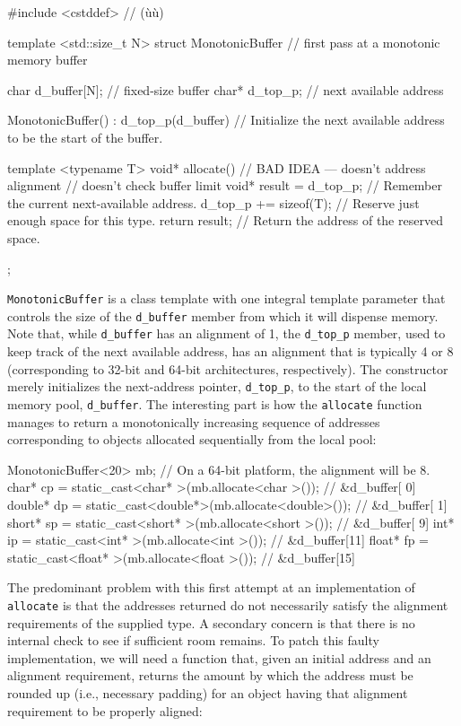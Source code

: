 \begin{emcppslisting}
#include <cstddef> // (ù{}ù) 

template <std::size_t N>
struct MonotonicBuffer  // first pass at a monotonic memory buffer
{
    char  d_buffer[N];  // fixed-size buffer
    char* d_top_p;      //  next available address

    MonotonicBuffer() : d_top_p(d_buffer) { }
       // Initialize the next available address to be the start of the buffer.

    template <typename T>
    void* allocate()             // BAD IDEA --- doesn't address alignment
                                 // doesn't check buffer limit
    {
        void* result = d_top_p;  // Remember the current next-available address.
        d_top_p += sizeof(T);    // Reserve just enough space for this type.
        return result;           // Return the address of the reserved space.
    }
};
\end{emcppslisting}
    
\noindent \lstinline!MonotonicBuffer! is a class template with one integral template
parameter that controls the size of the \lstinline!d_buffer! member from
which it will dispense memory. Note that, while \lstinline!d_buffer! has
an alignment of 1, the \lstinline!d_top_p! member, used to keep track of
the next available address, has an alignment that is typically 4 or 8
(corresponding to 32-bit and 64-bit architectures, respectively). The
constructor merely initializes the next-address pointer,
\lstinline!d_top_p!, to the start of the local memory pool,
\lstinline!d_buffer!. The interesting part is how the \lstinline!allocate!
function manages to return a monotonically increasing sequence of addresses corresponding to
objects allocated sequentially from the local pool:

\begin{emcppslisting}
MonotonicBuffer<20> mb;  // On a 64-bit platform, the alignment will be 8.
char*   cp = static_cast<char*  >(mb.allocate<char  >());  // &d_buffer[ 0]
double* dp = static_cast<double*>(mb.allocate<double>());  // &d_buffer[ 1]
short*  sp = static_cast<short* >(mb.allocate<short >());  // &d_buffer[ 9]
int*    ip = static_cast<int*   >(mb.allocate<int   >());  // &d_buffer[11]
float*  fp = static_cast<float* >(mb.allocate<float >());  // &d_buffer[15]
\end{emcppslisting}
    
\noindent The predominant problem with this first attempt at an implementation of
\lstinline!allocate! is that the addresses returned do not necessarily
satisfy the alignment requirements of the supplied type. A
secondary concern is that there is no internal check to see if
sufficient room remains. To patch this faulty implementation,
we will need a function that, given an initial address and an alignment
requirement, returns the amount by which the address must be rounded up
(i.e., necessary padding) for an object having that alignment
requirement to be properly aligned:

